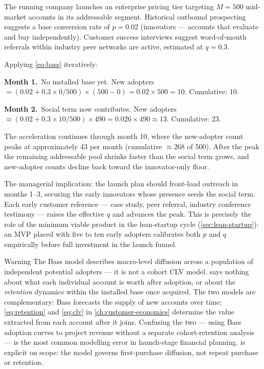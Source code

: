 \begin{example}
The running company launches an enterprise pricing tier targeting \(M = 500\) mid-market
accounts in its addressable segment. Historical outbound prospecting suggests a base
conversion rate of \(p = 0.02\) (innovators --- accounts that evaluate and buy
independently). Customer success interviews suggest word-of-mouth referrals within
industry peer networks are active, estimated at \(q = 0.3\).

Applying \cref{eq:bass} iteratively:

\medskip
\textbf{Month 1.}\ No installed base yet. New adopters \(= (0.02 + 0.3 \times 0/500)
\times (500 - 0) = 0.02 \times 500 = 10\). Cumulative: \num{10}.

\textbf{Month 2.}\ Social term now contributes. New adopters \(\approx (0.02 + 0.3
\times 10/500) \times 490 = 0.026 \times 490 \approx 13\). Cumulative: \num{23}.

The acceleration continues through month 10, where the new-adopter count peaks at
approximately \num{43} per month (cumulative \(\approx\num{268}\) of \num{500}).
After the peak the remaining addressable pool shrinks faster than the social term
grows, and new-adopter counts decline back toward the innovator-only floor.

The managerial implication: the launch plan should front-load outreach in months 1--3,
securing the early innovators whose presence seeds the social term. Each early customer
reference --- case study, peer referral, industry conference testimony --- raises the
effective \(q\) and advances the peak. This is precisely the role of the minimum
viable product in the lean-startup cycle (\cref{sec:lean-startup}): an MVP placed
with five to ten early adopters calibrates both \(p\) and \(q\) empirically before
full investment in the launch funnel.
\end{example}

\begin{admonition}{Warning}
The Bass model describes macro-level diffusion across a population of independent
potential adopters --- it is not a cohort CLV model.  says nothing about
what each individual account is worth after adoption, or about the \emph{retention}
dynamics within the installed base once acquired. The two models are complementary:
Bass forecasts the supply of new accounts over time; \cref{eq:retention} and \cref{eq:clv}
in \cref{ch:customer-economics} determine the value extracted from each account after
it joins. Confusing the two --- using Bass adoption curves to project revenue without
a separate cohort-retention analysis --- is the most common modelling error in
launch-stage financial planning. \textcite{bass1969newproduct} is explicit on scope:
the model governs first-purchase diffusion, not repeat purchase or retention.
\end{admonition}
